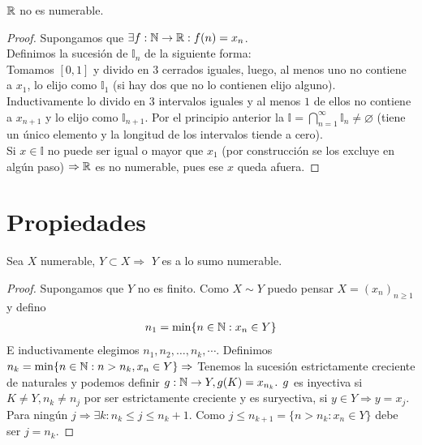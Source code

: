 \begin{theorem}
    \(\mathbb{R} \)  no es numerable.
    \begin{proof}
        Supongamos que \(\exists f:\mathbb{N} \to \mathbb{R} : f(n) = x_n\). \\
        Definimos la sucesión de \(\mathbb{I}_n\) de la siguiente forma: \\
        Tomamos \([0, 1]\) y divido en \(3\) cerrados iguales, luego, al menos uno no contiene a \(x_1\), lo elijo como \(\mathbb{I}_1\) (si  hay dos que no lo contienen elijo alguno). Inductivamente lo divido en \(3\) intervalos iguales y al menos \(1\) de ellos no contiene a \(x_{n+1} \) y lo elijo como \(\mathbb{I}_{n+1} \). Por el principio anterior la \(\mathbb{I} = \bigcap_{n=1}^\infty \mathbb{I}_n \neq \varnothing \) (tiene un único elemento y la longitud de los intervalos tiende a cero). \\
        Si \(x \in \mathbb{I} \) no puede ser igual o mayor que \(x_1\) (por construcción se los excluye en algún paso) \(\Rightarrow \mathbb{R} \) es no numerable, pues ese \(x\) queda afuera.
    \end{proof}
\end{theorem}

\section{Propiedades}

\begin{theorem}
    Sea \(X\) numerable, \(Y \subset X \Rightarrow \) \(Y\) es a lo sumo numerable.
    \begin{proof}
        Supongamos que \(Y\) no es finito. Como \(X \sim Y\) puedo pensar \(X = {(x_n)}_{n\geq1} \) y defino
        \begin{align*}
            n_1= \min\{ n \in \mathbb{N}: x_n \in Y \}
        \end{align*}
        E inductivamente elegimos \(n_1, n_2, \ldots , n_k, \cdots \). Definimos \(n_k = \min\{ n \in \mathbb{N} : n > n_k, x_n \in Y \} \Rightarrow \) Tenemos la sucesión estrictamente creciente de naturales y podemos definir \(g: \mathbb{N} \to Y, g(K) = x_{n_k} \text{. } g\) es inyectiva si \(K\neq Y, n_k \neq n_j\) por ser estrictamente creciente y es suryectiva, si \(y \in Y \Rightarrow y = x_j\). Para ningún \(j \Rightarrow \exists k :n_k\leq j \leq n_k+1\). Como \(j \leq n_{k+1}=\{ n>n_k:x_n \in Y \} \) debe ser \(j = n_k\).
    \end{proof}
\end{theorem}

